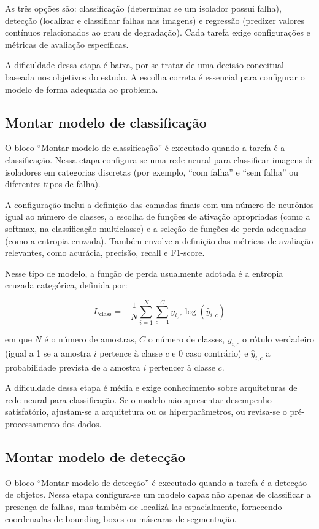 As três opções são: classificação (determinar se um isolador possui falha), detecção (localizar e classificar falhas nas imagens) e regressão (predizer valores contínuos relacionados ao grau de degradação). Cada tarefa exige configurações e métricas de avaliação específicas.

A dificuldade dessa etapa é baixa, por se tratar de uma decisão conceitual baseada nos objetivos do estudo. A escolha correta é essencial para configurar o modelo de forma adequada ao problema.

\subsection{Montar modelo de classificação}
O bloco ``Montar modelo de classificação'' é executado quando a tarefa é a classificação. Nessa etapa configura-se uma rede neural para classificar imagens de isoladores em categorias discretas (por exemplo, ``com falha'' e ``sem falha'' ou diferentes tipos de falha).

A configuração inclui a definição das camadas finais com um número de neurônios igual ao número de classes, a escolha de funções de ativação apropriadas (como a softmax, na classificação multiclasse) e a seleção de funções de perda adequadas (como a entropia cruzada). Também envolve a definição das métricas de avaliação relevantes, como acurácia, precisão, recall e F1-score.

Nesse tipo de modelo, a função de perda usualmente adotada é a entropia cruzada categórica, definida por:

\begin{equation}
    L_{\text{class}} = -\frac{1}{N} \sum_{i=1}^{N} \sum_{c=1}^{C} y_{i,c} \log(\hat{y}_{i,c})
    \label{eq:perda_classificacao}
\end{equation}

em que $N$ é o número de amostras, $C$ o número de classes, $y_{i,c}$ o rótulo verdadeiro (igual a 1 se a amostra $i$ pertence à classe $c$ e 0 caso contrário) e $\hat{y}_{i,c}$ a probabilidade prevista de a amostra $i$ pertencer à classe $c$.

A dificuldade dessa etapa é média e exige conhecimento sobre arquiteturas de rede neural para classificação. Se o modelo não apresentar desempenho satisfatório, ajustam-se a arquitetura ou os hiperparâmetros, ou revisa-se o pré-processamento dos dados.

\subsection{Montar modelo de detecção}
O bloco ``Montar modelo de detecção'' é executado quando a tarefa é a detecção de objetos. Nessa etapa configura-se um modelo capaz não apenas de classificar a presença de falhas, mas também de localizá-las espacialmente, fornecendo coordenadas de bounding boxes ou máscaras de segmentação.


